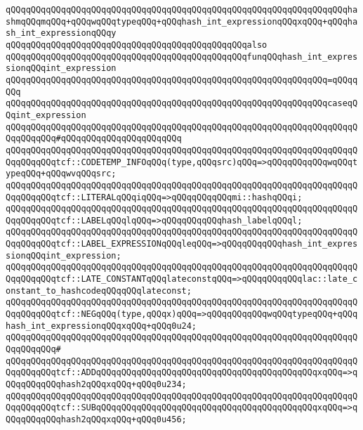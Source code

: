 \verb|qQQqqQQqqQQqqQQqqQQqqQQqqQQqqQQqqQQqqQQqqQQqqQQqqQQqqQQqqQQqqQQqqQQqhashmqQQqmqQQq+qQQqwqQQqtypeqQQq+qQQqhash_int_expressionqQQqxqQQq+qQQqhash_int_expressionqQQqy|\newline
\newline
\verb|qQQqqQQqqQQqqQQqqQQqqQQqqQQqqQQqqQQqqQQqqQQqqQQqalso|\newline
\verb|qQQqqQQqqQQqqQQqqQQqqQQqqQQqqQQqqQQqqQQqqQQqqQQqfunqQQqhash_int_expressionqQQqint_expression|\newline
\verb|qQQqqQQqqQQqqQQqqQQqqQQqqQQqqQQqqQQqqQQqqQQqqQQqqQQqqQQqqQQqqQQq=qQQqqQQq|\newline
\verb|qQQqqQQqqQQqqQQqqQQqqQQqqQQqqQQqqQQqqQQqqQQqqQQqqQQqqQQqqQQqqQQqcaseqQQqint_expression|\newline
\verb|qQQqqQQqqQQqqQQqqQQqqQQqqQQqqQQqqQQqqQQqqQQqqQQqqQQqqQQqqQQqqQQqqQQqqQQqqQQqqQQq#qQQqqQQqqQQqqQQqqQQqqQQq|\newline
\verb|qQQqqQQqqQQqqQQqqQQqqQQqqQQqqQQqqQQqqQQqqQQqqQQqqQQqqQQqqQQqqQQqqQQqqQQqqQQqqQQqtcf::CODETEMP_INFOqQQq(type,qQQqsrc)qQQq=>qQQqqQQqqQQqwqQQqtypeqQQq+qQQqwvqQQqsrc;|\newline
\verb|qQQqqQQqqQQqqQQqqQQqqQQqqQQqqQQqqQQqqQQqqQQqqQQqqQQqqQQqqQQqqQQqqQQqqQQqqQQqqQQqtcf::LITERALqQQqiqQQq=>qQQqqQQqqQQqmi::hashqQQqi;|\newline
\verb|qQQqqQQqqQQqqQQqqQQqqQQqqQQqqQQqqQQqqQQqqQQqqQQqqQQqqQQqqQQqqQQqqQQqqQQqqQQqqQQqtcf::LABELqQQqlqQQq=>qQQqqQQqqQQqhash_labelqQQql;|\newline
\verb|qQQqqQQqqQQqqQQqqQQqqQQqqQQqqQQqqQQqqQQqqQQqqQQqqQQqqQQqqQQqqQQqqQQqqQQqqQQqqQQqtcf::LABEL_EXPRESSIONqQQqleqQQq=>qQQqqQQqqQQqhash_int_expressionqQQqint_expression;|\newline
\verb|qQQqqQQqqQQqqQQqqQQqqQQqqQQqqQQqqQQqqQQqqQQqqQQqqQQqqQQqqQQqqQQqqQQqqQQqqQQqqQQqtcf::LATE_CONSTANTqQQqlateconstqQQq=>qQQqqQQqqQQqlac::late_constant_to_hashcodeqQQqqQQqlateconst;|\newline
\verb|qQQqqQQqqQQqqQQqqQQqqQQqqQQqqQQqqQQqqQQqqQQqqQQqqQQqqQQqqQQqqQQqqQQqqQQqqQQqqQQqtcf::NEGqQQq(type,qQQqx)qQQq=>qQQqqQQqqQQqwqQQqtypeqQQq+qQQqhash_int_expressionqQQqxqQQq+qQQq0u24;|\newline
\verb|qQQqqQQqqQQqqQQqqQQqqQQqqQQqqQQqqQQqqQQqqQQqqQQqqQQqqQQqqQQqqQQqqQQqqQQqqQQqqQQq#|\newline
\verb|qQQqqQQqqQQqqQQqqQQqqQQqqQQqqQQqqQQqqQQqqQQqqQQqqQQqqQQqqQQqqQQqqQQqqQQqqQQqqQQqtcf::ADDqQQqqQQqqQQqqQQqqQQqqQQqqQQqqQQqqQQqqQQqqQQqxqQQq=>qQQqqQQqqQQqhash2qQQqxqQQq+qQQq0u234;|\newline
\verb|qQQqqQQqqQQqqQQqqQQqqQQqqQQqqQQqqQQqqQQqqQQqqQQqqQQqqQQqqQQqqQQqqQQqqQQqqQQqqQQqtcf::SUBqQQqqQQqqQQqqQQqqQQqqQQqqQQqqQQqqQQqqQQqqQQqxqQQq=>qQQqqQQqqQQqhash2qQQqxqQQq+qQQq0u456;|\newline
